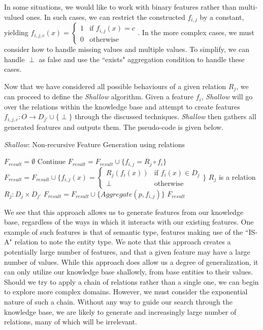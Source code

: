 \documentclass[twoside,11pt]{article}
\theoremstyle{definition}
\begin{document}
In some situations, we would like to work with binary features rather than multi-valued ones. In such cases, we can restrict the constructed $f_{i,j}$ by a constant, yielding $f_{i,j,c}(x)=\begin{cases}
1 & \mbox{if } f_{i,j}(x)=c\\
0 & \mbox{otherwise}
\end{cases}$. In the more complex cases, we must consider how to handle missing values and multiple values. To simplify, we can handle $\perp$ as false and use the ``exists" aggregation condition to handle these cases.

Now that we have considered all possible behaviours of a given relation $R_j$, we can proceed to define the \emph{Shallow} algorithm. Given a feature $f_i$, \emph{Shallow} will go over the relations within the knowledge base and attempt to create features $f_{i,j,c}:O\rightarrow D_{j'}\cup\{\perp\}$ through the discussed techniques. \emph{Shallow} then gathers all generated features and outputs them. The pseudo-code is given below.

\begin{algorithm}[H]
	\caption{\emph{Shallow}: Non-recursive Feature Generation using relations}
	\label{code-compete}
	\small
	\begin{algorithmic}
		\State $F_{result}=\emptyset$
			\State Continue
			\State $F_{result}=F_{result}\cup \{f_{i,j}=R_j\circ f_i\}$
			\State $F_{result}=F_{result}\cup \{f_{i,j}(x)=\begin{cases} R_j( f_i(x)) &\mbox{if } f_i(x)\in D_j\\ 
			\perp & \mbox{otherwise } \end{cases}\}$
		\Else \Comment $R_j$ is a relation $R_j:D_j\times D_{j'}$
		\State $F_{result}=F_{result}\cup \{Aggregate(p,f_{i,j})\}$
		\EndIf
		\EndFor
		\EndFor
		\State \Return $F_{result}$ 
		\EndFunction
		
	\end{algorithmic}
\end{algorithm}

We see that this approach allows us to generate features from our knowledge base, regardless of the ways in which it interacts with our existing features. One example of such features is that of semantic type, features making use of the ``IS-A" relation to note the entity type. We note that this approach creates a potentially large number of features, and that a given feature may have a large number of values. While this approach does allow us a degree of generalization, it can only utilize our knowledge base shallowly, from base entities to their values. 
Should we try to apply a chain of relations rather than a single one, we can begin to explore more complex domains. However, we must consider the exponential nature of such a chain. Without any way to guide our search through the knowledge base, we are likely to generate and increasingly large number of relations, many of which will be irrelevant. 
\end{document}
